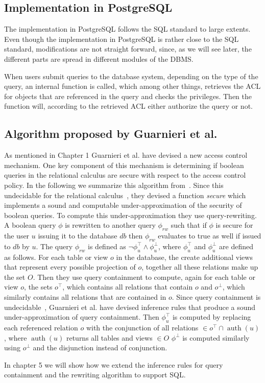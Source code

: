 \subsection{Implementation in PostgreSQL}

The implementation in PostgreSQL follows the SQL standard to large extents. 
%
Even though the implementation in PostgreSQL is rather close to the SQL standard, modifications are not straight forward, since, as we will see later, the different parts are spread in different modules of the DBMS.

When users submit queries to the database system, depending on the type of the query, an internal function is called, which among other things, retrieves the ACL for objects that are referenced in the query and checks the privileges.
%
Then the function will, according to the retrieved ACL either authorize the query or not.

\subsection{Algorithm proposed by Guarnieri et al.}

As mentioned in Chapter 1 Guarnieri et al. have devised a new access control mechanism.
%
One key component of this mechanism is determining if boolean queries in the relational calculus are secure with respect to the access control policy.
%
In the following we summarize this algorithm from~\cite{guarnieri2016strong}.
%
Since this undecidable for the relational calculus~\cite{guarnieri2014optimal}, they devised a function \emph{secure} which implements a sound and computable under-approximation of the security of boolean queries.
%
To compute this under-approximation they use query-rewriting.
%
A boolean query $\phi$ is rewritten to another query $\phi_{rw}$ such that if $\phi$ is secure for the user $u$ issuing it to the database $db$ then $\phi_{rw}$ evaluates to true as well if issued to $db$ by $u$.
%
The query $\phi_{rw}$ is defined as $\lnot \phi^\top_u \land \phi^\bot_u$, where $\phi^\top_u$ and $\phi^\bot_u$ are defined as follows.
%
For each table or view $o$ in the database, the create additional views that represent every possible projection of $o$, together all these relations make up the set $O$.
%
Then they use query containment to compute, again for each table or view $o$, the sets $o^\top$, which contains all relations that contain $o$ and $o^\bot$, which similarly contains all relations that are contained in $o$.
%
Since query containment is undecidable~\cite{abiteboul1995foundations}, Guarnieri et al. have devised inference rules that produce a sound under-approximation of query containment.
%
Then $\phi^\top_u$ is computed by replacing each referenced relation $o$ with the conjunction of all relations $\in o^\top \cap \operatorname{auth}(u)$, where $\operatorname{auth}(u)$ returns all tables and views $\in O$
%
$\phi^\bot$ is computed similarly using $o^\bot$ and the disjunction instead of conjunction.

In chapter 5 we will show how we extend the inference rules for query containment and the rewriting algorithm to support SQL.